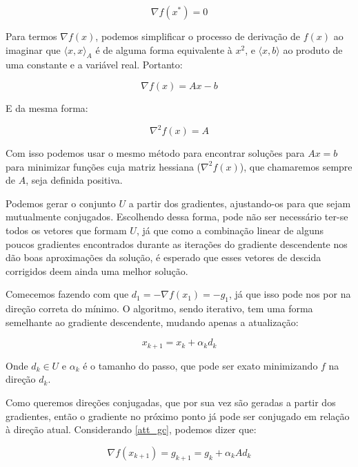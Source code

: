 \begin{equation}
\nabla f(x^*) = 0
\end{equation}

Para termos \(\nabla f(x)\), podemos simplificar o processo de derivação de \(f(x)\) ao imaginar
que \(\langle x, x \rangle_A\) é de alguma forma equivalente à \(x^2\), e \(\langle x, b \rangle\)
ao produto de uma constante e a variável real. Portanto:

\begin{equation}
\nabla f(x) = Ax - b
\end{equation}

E da mesma forma:

\begin{equation*}
\nabla^2 f(x) = A
\end{equation*}

Com isso podemos usar o mesmo método para encontrar soluções para \(Ax = b\) para
minimizar funções cuja matriz hessiana (\(\nabla^2 f(x)\)), que chamaremos sempre de \(A\),
seja definida positiva.

Podemos gerar o conjunto \(U\) a partir dos gradientes, ajustando-os para que sejam
mutualmente conjugados. Escolhendo dessa forma, pode não ser necessário ter-se todos os
vetores que formam \(U\), já que como a combinação linear de alguns poucos gradientes
encontrados durante as iterações do gradiente descendente nos dão boas aproximações da
solução, é esperado que esses vetores de descida corrigidos deem ainda uma melhor
solução.

Comecemos fazendo com que \(d_1 = -\nabla f(x_1) = -g_1 \), já que isso pode nos por na
direção correta do mínimo. O algoritmo, sendo iterativo, tem uma forma semelhante ao
gradiente descendente, mudando apenas a atualização:

\begin{equation}
\label{att_gc}
x_{k+1} = x_k + \alpha_k d_k
\end{equation}

Onde \(d_k \in U\) e \(\alpha_k\) é o tamanho do passo, que pode ser exato minimizando
\(f\) na direção \(d_k\).

Como queremos direções conjugadas, que por sua vez são geradas a partir dos gradientes,
então o gradiente no próximo ponto já pode ser conjugado em relação à direção atual.
Considerando \ref{att_gc}, podemos dizer que:

\begin{equation}
  \label{def_gc_gk1}
  \nabla f(x_{k+1}) = g_{k+1} = g_k + \alpha_k Ad_k
\end{equation}

